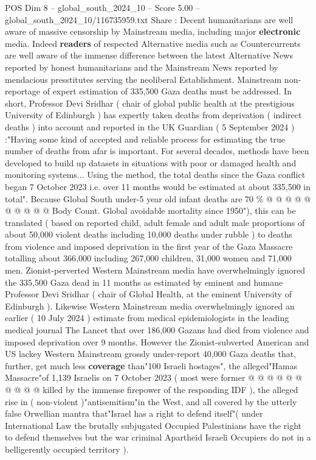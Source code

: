 \begin{textsample}{POS Dim 8 – global\_south\_2024\_10 – Score 5.00 – global\_south\_2024\_10/116735959.txt}  \label{ex:f8_pos_301}
Share : Decent humanitarians are well aware of massive censorship by Mainstream media, including major \textbf{electronic} media.
Indeed \textbf{readers} of respected Alternative media such as Countercurrents are well aware of the immense difference between the latest Alternative News reported by honest humanitarians and the Mainstream News reported by mendacious presstitutes serving the neoliberal Establishment.
Mainstream non-reportage of expert estimation of 335,500 Gaza deaths must be addressed.
In short, Professor Devi Sridhar ( chair of global public health at the prestigious University of Edinburgh ) has expertly taken deaths from deprivation ( indirect deaths ) into account and reported in the UK Guardian ( 5 September 2024 ) :"Having some kind of accepted and reliable process for estimating the true number of deaths from afar is important.
For several decades, methods have been developed to build up datasets in situations with poor or damaged health and monitoring systems...
Using the method, the total deaths since the Gaza conflict began 7 October 2023 i.e. over 11 months would be estimated at about 335,500 in total".
Because Global South under-5 year old infant deaths are 70 \% @ @ @ @ @ @ @ @ @ @ Body Count.
Global avoidable mortality since 1950"), this can be translated ( based on reported child, adult female and adult male proportions of about 50,000 violent deaths including 10,000 deaths under rubble ) to deaths from violence and imposed deprivation in the first year of the Gaza Massacre totalling about 366,000 including 267,000 children, 31,000 women and 71,000 men.
Zionist-perverted Western Mainstream media have overwhelmingly ignored the 335,500 Gaza dead in 11 months as estimated by eminent and humane Professor Devi Sridhar ( chair of Global Health, at the eminent University of Edinburgh ).
Likewise Western Mainstream media overwhelmingly ignored an earlier ( 10 July 2024 ) estimate from medical epidemiologists in the leading medical journal The Lancet that over 186,000 Gazans had died from violence and imposed deprivation over 9 months.
However the Zionist-subverted American and US lackey Western Mainstream grossly under-report 40,000 Gaza deaths that, further, get much less \textbf{coverage} than"100 Israeli hostages", the alleged"Hamas Massacre"of 1,139 Israelis on 7 October 2023 ( most were former @ @ @ @ @ @ @ @ @ @ killed by the immense firepower of the responding IDF ), the alleged rise in ( non-violent )"antisemitism"in the West, and all covered by the utterly false Orwellian mantra that"Israel has a right to defend itself"( under International Law the brutally subjugated Occupied Palestinians have the right to defend themselves but the war criminal Apartheid Israeli Occupiers do not in a belligerently occupied territory ).

\end{textsample}
